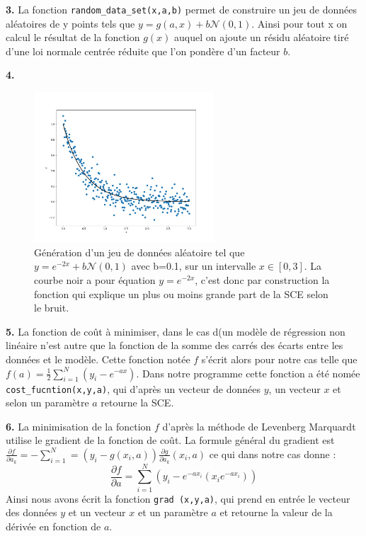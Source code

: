 \documentclass[12pt]{article}
\begin{document}
\textbf{\color{brick}3.} La fonction \verb|random_data_set(x,a,b)| permet de construire un jeu de données aléatoires de y points tels que  $y= g(a,x) +b \mathcal{N}(0,1)$. Ainsi pour tout x on calcul le résultat de la fonction $g(x)$ auquel on ajoute un résidu aléatoire tiré d'une loi normale centrée réduite que l'on pondère d'un facteur $b$.
\newpage

\textbf{\color{brick}4.} 
\begin{figure}[H]
\centering
\includegraphics[width=0.6\textwidth]{Q4.png}
\caption{Génération d'un jeu de données aléatoire tel que $y= e^{-2x} + b \mathcal{N}(0,1) $ avec b=0.1, sur un intervalle $x\in[0,3]$. La courbe noir a pour équation $y= e^{-2x}$, c'est donc par construction la fonction qui explique un plus ou moins grande part de la SCE selon le bruit. }
\label{Fig1}
\end{figure}

\textbf{\color{brick}5.} La fonction de coût à minimiser, dans le cas d(un modèle de régression non linéaire n'est autre que la fonction de la somme des carrés des écarts entre les données et le modèle. Cette fonction notée $f$ s'écrit alors  pour notre cas telle que $f(a) =\frac{1}{2}\sum_{i=1}^N(y_i - e^{-ax}) $.  Dans notre programme cette fonction a été nomée \verb|cost_fucntion(x,y,a)|, qui d'après un vecteur de données $y$, un vecteur $x$ et selon un paramètre $a$ retourne la SCE.


\textbf{\color{brick}6.} La minimisation de la fonction $f$ d'après la méthode de Levenberg Marquardt utilise le gradient de la fonction de coût. La formule général du gradient est \\
$\frac{\partial f}{\partial a_k} = - \sum_{i=1}^N = (y_i - g(x_i,a))\frac{\partial g}{\partial a_k}(x_i,a) $  ce qui dans notre cas donne :
$$ \frac{\partial f}{\partial a} =\sum_{i=1}^N (y_i - e^{-ax_i}(x_ie^{-ax_i})) $$
Ainsi nous avons écrit la fonction \verb|grad (x,y,a)|, qui prend en entrée le vecteur des données $y$ et un vecteur $x$ et un paramètre $a$  et retourne la valeur de la dérivée en fonction de $a$.
 
\end{document}
